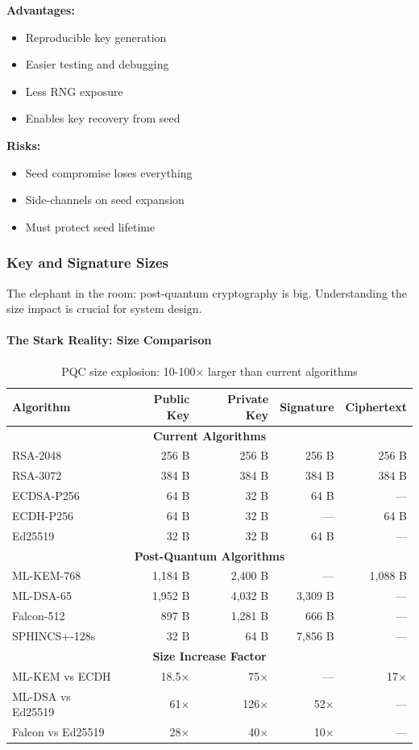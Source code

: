 \documentclass[11pt,a4paper]{article}
\begin{document}
\textbf{Advantages:}
\begin{itemize}
    \item Reproducible key generation
    \item Easier testing and debugging
    \item Less RNG exposure
    \item Enables key recovery from seed
\end{itemize}

\textbf{Risks:}
\begin{itemize}
    \item Seed compromise loses everything
    \item Side-channels on seed expansion
    \item Must protect seed lifetime
\end{itemize}

\subsubsection{Key and Signature Sizes}

The elephant in the room: post-quantum cryptography is big. Understanding the size impact is crucial for system design.

\paragraph{The Stark Reality: Size Comparison}

\begin{table}[h]
\centering
\begin{tabular}{|l|r|r|r|r|}
\hline
\textbf{Algorithm} & \textbf{Public Key} & \textbf{Private Key} & \textbf{Signature} & \textbf{Ciphertext} \\
\hline
\multicolumn{5}{|c|}{\textbf{Current Algorithms}} \\
\hline
RSA-2048 & 256 B & 256 B & 256 B & 256 B \\
RSA-3072 & 384 B & 384 B & 384 B & 384 B \\
ECDSA-P256 & 64 B & 32 B & 64 B & — \\
ECDH-P256 & 64 B & 32 B & — & 64 B \\
Ed25519 & 32 B & 32 B & 64 B & — \\
\hline
\multicolumn{5}{|c|}{\textbf{Post-Quantum Algorithms}} \\
\hline
ML-KEM-768 & 1,184 B & 2,400 B & — & 1,088 B \\
ML-DSA-65 & 1,952 B & 4,032 B & 3,309 B & — \\
Falcon-512 & 897 B & 1,281 B & 666 B & — \\
SPHINCS+-128s & 32 B & 64 B & 7,856 B & — \\
\hline
\multicolumn{5}{|c|}{\textbf{Size Increase Factor}} \\
\hline
ML-KEM vs ECDH & 18.5× & 75× & — & 17× \\
ML-DSA vs Ed25519 & 61× & 126× & 52× & — \\
Falcon vs Ed25519 & 28× & 40× & 10× & — \\
\hline
\end{tabular}
\caption{PQC size explosion: 10-100× larger than current algorithms}
\end{table}
\end{document}
